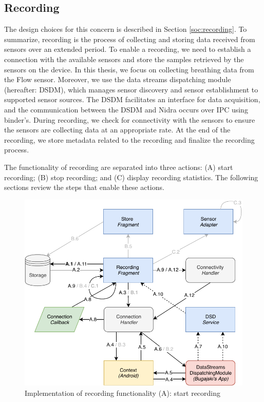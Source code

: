 \subsection{Recording}
The design choices for this concern is described in Section \ref{soc:recording}. To summarize, recording is the process of collecting and storing data received from sensors over an extended period. To enable a recording, we need to establish a connection with the available sensors and store the samples retrieved by the sensors on the device. In this thesis, we focus on collecting breathing data from the Flow sensor. Moreover, we use the data streams dispatching module (hereafter: DSDM), which manages sensor discovery and sensor establishment to supported sensor sources. The DSDM facilitates an interface for data acquisition, and the communication between the DSDM and Nidra occurs over IPC using binder's. During recording, we check for connectivity with the sensors to ensure the sensors are collecting data at an appropriate rate. At the end of the recording, we store metadata related to the recording and finalize the recording process. 

The functionality of recording are separated into three actions: (A) start recording; (B) stop recording; and (C) display recording statistics. The following sections review the steps that enable these actions. 

\begin{figure}[!h]
    \centering
    \includegraphics[scale=0.7]{images/Recording_ImpA.pdf}
    \caption{Implementation of recording functionality (A): start recording}
    \label{fig:impl_recordingA}
\end{figure}

